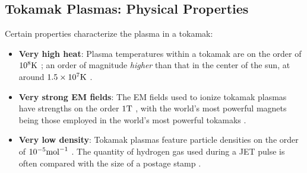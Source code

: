 \subsection*{Tokamak Plasmas: Physical Properties}
    Certain properties characterize the plasma in a tokamak:
    \begin{itemize}
        \item  {\bf Very high heat}: Plasma temperatures within a tokamak are on the order of $10^{8}\mathrm{K}$ \BA{[Ref]}; an order of magnitude \emph{higher} than that in the center of the sun, at around $1.5\times10^{7}\mathrm{K}$ \BA{[Ref]}.
        \item  {\bf Very strong EM fields}: The EM fields used to ionize tokamak plasmas have strengths on the order $1\mathrm{T}$ \BA{[Ref]}, with the world's most powerful magnets being those employed in the world's most powerful tokamaks \BA{[Ref]}.
        \item  {\bf Very low density}:  Tokamak plasmas feature particle densities on the order of $10^{- 5}{\rm mol}^{- 1}$   \BA{[Ref]}. The quantity of hydrogen gas used during a JET pulse is often compared with the size  of a postage stamp \BA{[Ref]}.
    \end{itemize}



    